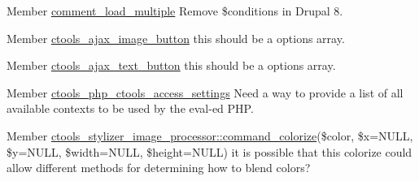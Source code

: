 \label{todo__todo000014}
\hypertarget{todo__todo000014}{}
 
\begin{DoxyDescription}
\item[Member \hyperlink{comment_8module_a0cfb98e73c618190693b683c9bbfc0b1}{comment\_\-load\_\-multiple} ]Remove \$conditions in Drupal 8. 
\end{DoxyDescription}

\label{todo__todo000032}
\hypertarget{todo__todo000032}{}
 
\begin{DoxyDescription}
\item[Member \hyperlink{profiles_2dosomething_2modules_2contrib_2ctools_2includes_2ajax_8inc_a00499a965fd0a192af2106a400c0e140}{ctools\_\-ajax\_\-image\_\-button} ]this should be a options array. 
\end{DoxyDescription}

\label{todo__todo000033}
\hypertarget{todo__todo000033}{}
 
\begin{DoxyDescription}
\item[Member \hyperlink{profiles_2dosomething_2modules_2contrib_2ctools_2includes_2ajax_8inc_aa20aff28acfb85cc21e49727d3126aad}{ctools\_\-ajax\_\-text\_\-button} ]this should be a options array. 
\end{DoxyDescription}

\label{todo__todo000043}
\hypertarget{todo__todo000043}{}
 
\begin{DoxyDescription}
\item[Member \hyperlink{php_8inc_ad173cf9e9891ef70924fad63a89396fa}{ctools\_\-php\_\-ctools\_\-access\_\-settings} ]Need a way to provide a list of all available contexts to be used by the eval-\/ed PHP. 
\end{DoxyDescription}

\label{todo__todo000035}
\hypertarget{todo__todo000035}{}
 
\begin{DoxyDescription}
\item[Member \hyperlink{classctools__stylizer__image__processor_a1bb5df184af0c953ce5d12567ec4282f}{ctools\_\-stylizer\_\-image\_\-processor::command\_\-colorize}(\$color, \$x=NULL, \$y=NULL, \$width=NULL, \$height=NULL) ]it is possible that this colorize could allow different methods for determining how to blend colors? 
\end{DoxyDescription}

\label{todo__todo000036}
\hypertarget{todo__todo000036}{}
 
